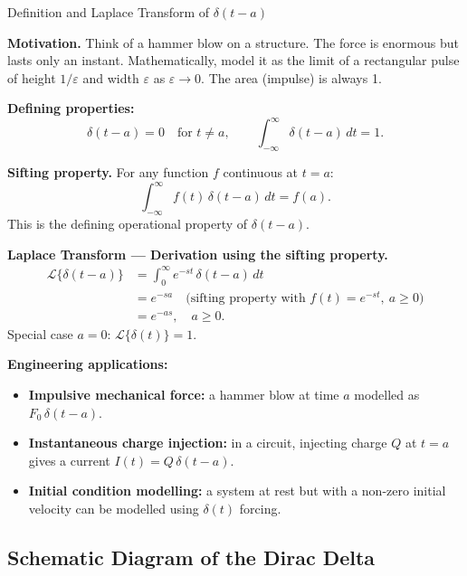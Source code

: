 \documentclass[12pt,a4paper]{article}
\begin{document}
\begin{infobox}{Definition and Laplace Transform of $\delta(t-a)$}

\textbf{Motivation.} Think of a hammer blow on a structure. The force is
enormous but lasts only an instant. Mathematically, model it as the limit of a
rectangular pulse of height $1/\varepsilon$ and width $\varepsilon$ as
$\varepsilon \to 0$. The area (impulse) is always 1.

\medskip
\textbf{Defining properties:}
\[
  \delta(t - a) = 0 \quad \text{for } t \neq a, \qquad
  \int_{-\infty}^{\infty} \delta(t - a)\, dt = 1.
\]

\medskip
\textbf{Sifting property.} For any function $f$ continuous at $t = a$:
\[
  \int_{-\infty}^{\infty} f(t)\,\delta(t - a)\, dt = f(a).
\]
This is the defining operational property of $\delta(t-a)$.

\medskip
\textbf{Laplace Transform --- Derivation using the sifting property.}
\begin{align*}
  \mathcal{L}\{\delta(t-a)\}
  &= \int_0^{\infty} e^{-st}\,\delta(t-a)\, dt \\
  &= e^{-sa} \quad \text{(sifting property with } f(t) = e^{-st},\ a \geq 0\text{)} \\[4pt]
  &= \boxed{e^{-as}}, \quad a \geq 0.
\end{align*}
Special case $a = 0$: $\mathcal{L}\{\delta(t)\} = 1$.

\medskip
\textbf{Engineering applications:}
\begin{itemize}
  \item \textbf{Impulsive mechanical force:} a hammer blow at time $a$
        modelled as $F_0\,\delta(t-a)$.
  \item \textbf{Instantaneous charge injection:} in a circuit, injecting
        charge $Q$ at $t = a$ gives a current $I(t) = Q\,\delta(t-a)$.
  \item \textbf{Initial condition modelling:} a system at rest but with a
        non-zero initial velocity can be modelled using $\delta(t)$ forcing.
\end{itemize}

\end{infobox}

\subsection{Schematic Diagram of the Dirac Delta}

\begin{center}
\end{center}
\end{document}

